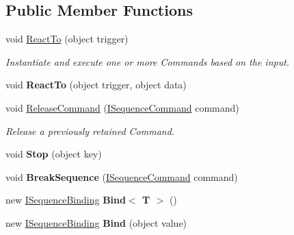 \subsection*{Public Member Functions}
\begin{DoxyCompactItemize}
\item 
void \hyperlink{interfacebabel_1_1extensions_1_1sequencer_1_1api_1_1_i_sequencer_ad8f614bd0e256b4e343c625160594dc6}{React\-To} (object trigger)
\begin{DoxyCompactList}\small\item\em Instantiate and execute one or more Commands based on the input. \end{DoxyCompactList}\item 
\hypertarget{interfacebabel_1_1extensions_1_1sequencer_1_1api_1_1_i_sequencer_a4a8a1095c68cc16cf0a90f54ff8a0f2b}{void {\bfseries React\-To} (object trigger, object data)}\label{interfacebabel_1_1extensions_1_1sequencer_1_1api_1_1_i_sequencer_a4a8a1095c68cc16cf0a90f54ff8a0f2b}

\item 
void \hyperlink{interfacebabel_1_1extensions_1_1sequencer_1_1api_1_1_i_sequencer_ae526452e96a17561bb513aff2f3afe36}{Release\-Command} (\hyperlink{interfacebabel_1_1extensions_1_1sequencer_1_1api_1_1_i_sequence_command}{I\-Sequence\-Command} command)
\begin{DoxyCompactList}\small\item\em Release a previously retained Command. \end{DoxyCompactList}\item 
\hypertarget{interfacebabel_1_1extensions_1_1sequencer_1_1api_1_1_i_sequencer_ad15bf8aab592911089c988cb1f62d264}{void {\bfseries Stop} (object key)}\label{interfacebabel_1_1extensions_1_1sequencer_1_1api_1_1_i_sequencer_ad15bf8aab592911089c988cb1f62d264}

\item 
\hypertarget{interfacebabel_1_1extensions_1_1sequencer_1_1api_1_1_i_sequencer_ade28c55683d1e969c68b303571c0b8df}{void {\bfseries Break\-Sequence} (\hyperlink{interfacebabel_1_1extensions_1_1sequencer_1_1api_1_1_i_sequence_command}{I\-Sequence\-Command} command)}\label{interfacebabel_1_1extensions_1_1sequencer_1_1api_1_1_i_sequencer_ade28c55683d1e969c68b303571c0b8df}

\item 
\hypertarget{interfacebabel_1_1extensions_1_1sequencer_1_1api_1_1_i_sequencer_a0018ea5636002426f16518623425ec78}{new \hyperlink{interfacebabel_1_1extensions_1_1sequencer_1_1api_1_1_i_sequence_binding}{I\-Sequence\-Binding} {\bfseries Bind$<$ T $>$} ()}\label{interfacebabel_1_1extensions_1_1sequencer_1_1api_1_1_i_sequencer_a0018ea5636002426f16518623425ec78}

\item 
\hypertarget{interfacebabel_1_1extensions_1_1sequencer_1_1api_1_1_i_sequencer_acc3d8801441ad0319b1d9215443f67fb}{new \hyperlink{interfacebabel_1_1extensions_1_1sequencer_1_1api_1_1_i_sequence_binding}{I\-Sequence\-Binding} {\bfseries Bind} (object value)}\label{interfacebabel_1_1extensions_1_1sequencer_1_1api_1_1_i_sequencer_acc3d8801441ad0319b1d9215443f67fb}

\end{DoxyCompactItemize}


